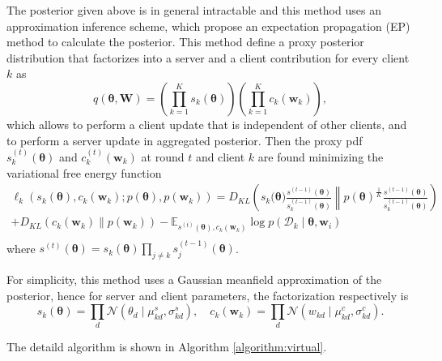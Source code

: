 \documentclass[a4paper,12pt,authoryear]{elegantpaper}
\begin{document}
The posterior given above is in general intractable and this method uses an approximation inference scheme, which propose an expectation propagation (EP) method to calculate the posterior. This method define a proxy posterior distribution that factorizes into a server
and a client contribution for every client $k$ as
\begin{equation}
    q(\mathbf{\theta},\mathbf{W})=\left(\prod_{k=1}^{K}s_{k}(\mathbf{\theta})\right)\left(\prod_{k=1}^{K}c_{k}\left(\textbf{w}_{k}\right)\right),
\end{equation}
which allows to perform a client update that is independent of other clients, and to perform a server update in aggregated posterior. Then the proxy pdf $s_{k}^{(t)}(\mathbf{\theta})$ and $c_{k}^{(t)}\left(\mathbf{w}_{k}\right)$ at round $t$ and client $k$ are found minimizing the variational free energy function
\begin{equation}
    \begin{array}{c}
        \ell_{k}\left(s_{k}(\mathbf{\theta}),c_{k}\left(\mathbf{w}_{k}\right);p(\mathbf{\theta}),p(\mathbf{w}_{k})\right) = D_{KL}\left(s_{k}(\left.\mathbf{\theta})\frac{s^{(t-1)}(\mathbf{\theta})}{s_{k}^{(t-1)}(\mathbf{\theta})}\right\|p(\mathbf{\theta})^{\frac{1}{K}}\frac{s^{(t-1)}(\mathbf{\theta})}{s_{k}^{(t-1)}(\mathbf{\theta})}\right) \\
        +D_{KL}\left(c_{k}\left(\textbf{w}_{k}\right)\|p\left(\textbf{w}_{k}\right)\right)-\mathbb{E}_{s^{(t)}(\mathbf{\theta}),c_{k}(\mathbf{w}_{k})}\log p\left(\mathcal{D}_{k}\mid\mathbf{\theta},\mathbf{w}_{i}\right)                                                                                                                            \\
    \end{array}
\end{equation}
where $s^{(t)}(\mathbf{\theta})=s_{k}(\mathbf{\theta})\prod_{j\neq k}s_{j}^{(t-1)}(\mathbf{\theta})$.

For simplicity, this method uses a Gaussian meanfield approximation of the posterior, hence for server and client parameters, the factorization respectively is
\begin{equation}
    s_{k}(\mathbf{\theta})=\prod_{d}\mathcal{N}\left(\theta_{d}\mid\mu_{kd}^{s},\sigma_{kd}^{s}\right),\quad c_{k}\left(\mathbf{w}_{k}\right)=\prod_{d}\mathcal{N}\left(w_{kd}\mid\mu_{kd}^{c}, \sigma_{kd}^{c}\right).
\end{equation}

The detaild algorithm is shown in Algorithm \ref{algorithm:virtual}.
\end{document}
